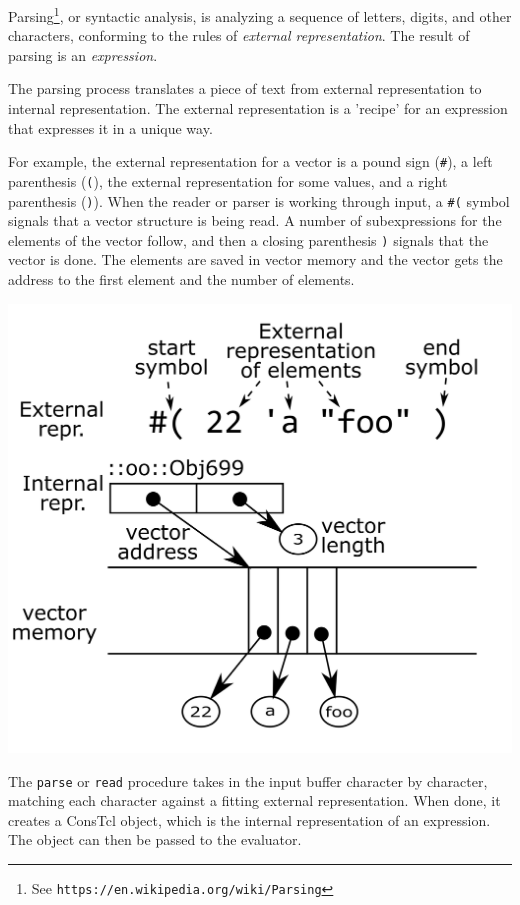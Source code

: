 \documentclass[twoside,9pt]{report}
\begin{document}
Parsing\footnote{See \texttt{https://en.wikipedia.org/wiki/Parsing}}, or syntactic analysis, is analyzing a sequence of letters, digits, and other characters, conforming to the rules of \emph{external representation}. The result of parsing is an \emph{expression}.


The parsing process translates a piece of text from external representation to internal representation. The external representation is a 'recipe' for an expression that expresses it in a unique way.


For example, the external representation for a vector is a pound sign (\texttt{\#}), a left parenthesis (\texttt{(}), the external representation for some values, and a right parenthesis (\texttt{)}). When the reader or parser is working through input, a \texttt{\#(} symbol signals that a vector structure is being read. A number of subexpressions for the elements of the vector follow, and then a closing parenthesis \texttt{)} signals that the vector is done. The elements are saved in vector memory and the vector gets the address to the first element and the number of elements.

\includegraphics{images/vector-representation.png}

The \texttt{parse} or \texttt{read} procedure takes in the input buffer character by character, matching each character against a fitting external representation. When done, it creates a ConsTcl object, which is the internal representation of an expression. The object can then be passed to the evaluator.
\end{document}
